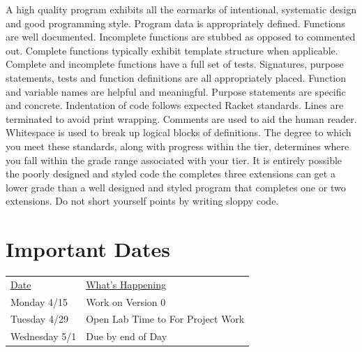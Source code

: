 \documentclass[nobib]{tufte-handout}
\begin{document}
A high quality program exhibits all the earmarks of intentional, systematic design and good programming style. Program data is appropriately defined. Functions are well documented. Incomplete functions are stubbed as opposed to commented out. Complete functions typically exhibit template structure when applicable. Complete and incomplete functions have a full set of tests. Signatures, purpose statements, tests and function definitions are all appropriately placed.  Function and variable names are helpful and meaningful. Purpose statements are specific and concrete. Indentation of code follows expected Racket standards. Lines are terminated to avoid print wrapping. Comments are used to aid the human reader. Whitespace is used to break up logical blocks of definitions. The degree to which you meet these standards, along with progress within the tier, determines where you fall within the grade range associated with your tier. It is entirely possible the poorly designed and styled code the completes three extensions can get a lower grade than a well designed and styled program that completes one or two extensions. Do not short yourself points by writing sloppy code.


\section*{Important Dates}

\begin{tabular}{ll}
\underline{Date} & \underline{What's Happening} \\
 Monday 4/15 & Work on Version 0 \\
 Tuesday 4/29 & Open Lab Time to For Project Work \\
 Wednesday 5/1 & Due by end of Day
\end{tabular}
\end{document}
